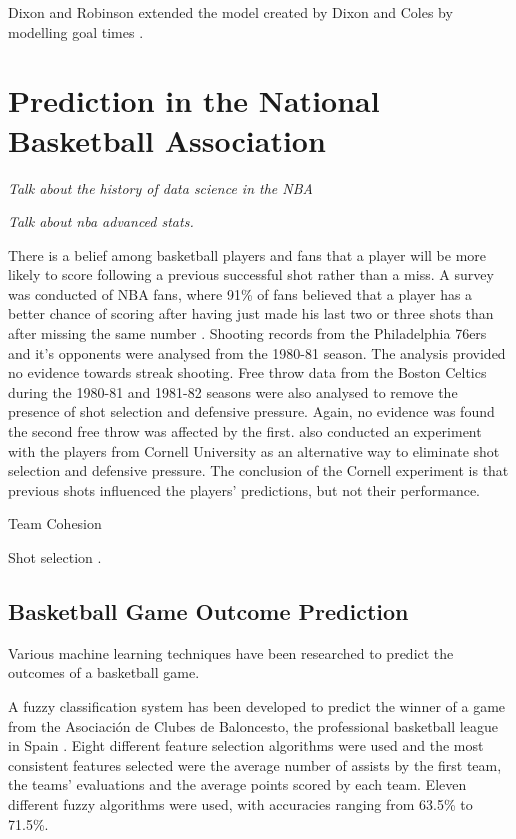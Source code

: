 Dixon and Robinson extended the model created by Dixon and Coles by modelling goal times \citep{dixon_robinson}.

\section{Prediction in the National Basketball Association}
\textit{Talk about the history of data science in the NBA}

\textit{Talk about nba advanced stats.}

There is a belief among basketball players and fans that a player will be more likely to score following a previous successful shot rather than a miss.  A survey was conducted of NBA fans, where 91\% of fans believed that a player has a better chance of scoring after having just made his last two or three shots than after missing the same number \citep{nba_hot_hand}.  Shooting records from the Philadelphia 76ers and it's opponents were analysed from the 1980-81 season.   The analysis provided no evidence towards streak shooting.  Free throw data from the Boston Celtics during the 1980-81 and 1981-82 seasons were also analysed to remove the presence of shot selection and defensive pressure.  Again, no evidence was found the second free throw was affected by the first.  \citep{nba_hot_hand} also conducted an experiment with the players from Cornell University as an alternative way to eliminate shot selection and defensive pressure.  The conclusion of the Cornell experiment is that previous shots influenced the players' predictions, but not their performance.  

Team Cohesion \cite{team_cohesion}

Shot selection \cite{nba_spatial_analysis}.


\subsection{Basketball Game Outcome Prediction}

Various machine learning techniques have been researched to predict the outcomes of a basketball game.

A fuzzy classification system has been developed to predict the winner of a game from the Asociaci\'on de Clubes de Baloncesto, the professional basketball league in Spain \citep{nba_fuzzy_prediction}.  Eight different feature selection algorithms were used and the most consistent features selected were the average number of assists by the first team, the teams' evaluations and the average points scored by each team.  Eleven different fuzzy algorithms were used, with accuracies ranging from 63.5\% to 71.5\%.


